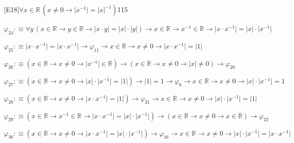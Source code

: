 \begin{fullproof}{[E18]}{$\forall x \in \mathbb{R}\,(x \neq 0 \to \lvert x^{-1} \rvert = \lvert x \rvert^{-1})$}{115}
\begin{abbrevlist}
\item $\varphi_{24} :\equiv \forall y\,(x \in \mathbb{R} \to y \in \mathbb{R} \to \lvert x \cdot y \rvert = \lvert x \rvert \cdot \lvert y \rvert) \to x \in \mathbb{R} \to x^{-1} \in \mathbb{R} \to \lvert x \cdot x^{-1} \rvert = \lvert x \rvert \cdot \lvert x^{-1} \rvert$
\item $\varphi_{25} :\equiv \lvert x \cdot x^{-1} \rvert = \lvert x \cdot x^{-1} \rvert \to \varphi_{11} \to x \in \mathbb{R} \to x \neq 0 \to \lvert x \cdot x^{-1} \rvert = \lvert 1 \rvert$
\item $\varphi_{26} :\equiv (x \in \mathbb{R} \to x \neq 0 \to \lvert x^{-1} \rvert \in \mathbb{R}) \to (x \in \mathbb{R} \to x \neq 0 \to \lvert x \rvert \neq 0) \to \varphi_{20}$
\item $\varphi_{27} :\equiv (x \in \mathbb{R} \to x \neq 0 \to \lvert x \rvert \cdot \lvert x^{-1} \rvert = \lvert 1 \rvert) \to \lvert 1 \rvert = 1 \to \varphi_{6} \to x \in \mathbb{R} \to x \neq 0 \to \lvert x \rvert \cdot \lvert x^{-1} \rvert = 1$
\item $\varphi_{28} :\equiv (x \in \mathbb{R} \to x \neq 0 \to \lvert x \cdot x^{-1} \rvert = \lvert 1 \rvert) \to \varphi_{21} \to x \in \mathbb{R} \to x \neq 0 \to \lvert x \rvert \cdot \lvert x^{-1} \rvert = \lvert 1 \rvert$
\item $\varphi_{29} :\equiv (x \in \mathbb{R} \to x^{-1} \in \mathbb{R} \to \lvert x \cdot x^{-1} \rvert = \lvert x \rvert \cdot \lvert x^{-1} \rvert) \to (x \in \mathbb{R} \to x \neq 0 \to x \in \mathbb{R}) \to \varphi_{22}$
\item $\varphi_{30} :\equiv (x \in \mathbb{R} \to x \neq 0 \to \lvert x \cdot x^{-1} \rvert = \lvert x \rvert \cdot \lvert x^{-1} \rvert) \to \varphi_{16} \to x \in \mathbb{R} \to x \neq 0 \to \lvert x \rvert \cdot \lvert x^{-1} \rvert = \lvert x \cdot x^{-1} \rvert$
\end{abbrevlist}
\end{fullproof}

